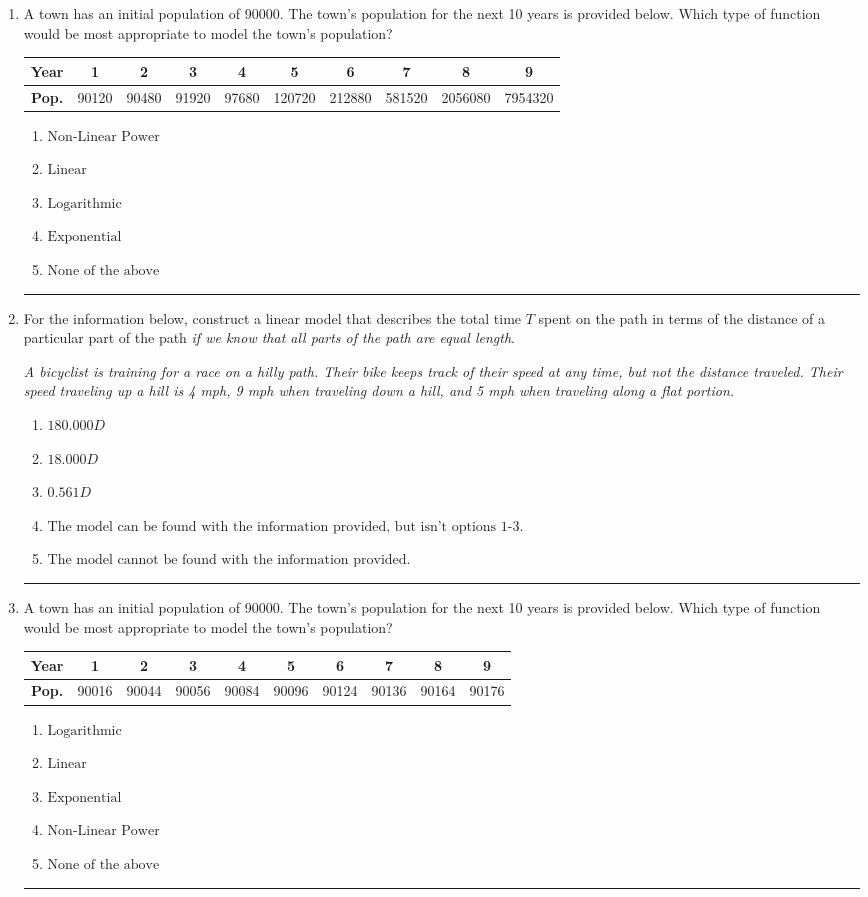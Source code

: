 \documentclass[14pt]{extbook}
\newcommand{\litem}[1]{\item#1\hspace*{-1cm}\rule{\textwidth}{0.4pt}}
\begin{document}
\begin{enumerate}
\litem{
A town has an initial population of 90000. The town's population for the next 10 years is provided below. Which type of function would be most appropriate to model the town's population?


\begin{tabular}{c|c|c|c|c|c|c|c|c|c}
\textbf{Year} & 1 & 2 & 3 & 4 & 5 & 6 & 7 & 8 & 9 \tabularnewline
\hline
\textbf{Pop.} & 90120 & 90480 & 91920 & 97680 & 120720 & 212880 & 581520 & 2056080 & 7954320
\end{tabular} \begin{enumerate}[label=\Alph*.]
\item \( \text{Non-Linear Power} \)
\item \( \text{Linear} \)
\item \( \text{Logarithmic} \)
\item \( \text{Exponential} \)
\item \( \text{None of the above} \)

\end{enumerate} }
\litem{
For the information below, construct a linear model that describes the total time $T$ spent on the path in terms of the distance of a particular part of the path \textit{if we know that all parts of the path are equal length}.
\begin{center}
    \textit{ A bicyclist is training for a race on a hilly path. Their bike keeps track of their speed at any time, but not the distance traveled. Their speed traveling up a hill is 4 mph, 9 mph when traveling down a hill, and 5 mph when traveling along a flat portion. }
\end{center}
\begin{enumerate}[label=\Alph*.]
\item \( 180.000 D \)
\item \( 18.000 D \)
\item \( 0.561 D \)
\item \( \text{The model can be found with the information provided, but isn't options 1-3.} \)
\item \( \text{The model cannot be found with the information provided.} \)

\end{enumerate} }
\litem{
A town has an initial population of 90000. The town's population for the next 10 years is provided below. Which type of function would be most appropriate to model the town's population?


\begin{tabular}{c|c|c|c|c|c|c|c|c|c}
\textbf{Year} & 1 & 2 & 3 & 4 & 5 & 6 & 7 & 8 & 9 \tabularnewline
\hline
\textbf{Pop.} & 90016 & 90044 & 90056 & 90084 & 90096 & 90124 & 90136 & 90164 & 90176
\end{tabular} \begin{enumerate}[label=\Alph*.]
\item \( \text{Logarithmic} \)
\item \( \text{Linear} \)
\item \( \text{Exponential} \)
\item \( \text{Non-Linear Power} \)
\item \( \text{None of the above} \)


\end{enumerate}}
\end{enumerate}
\end{document}

